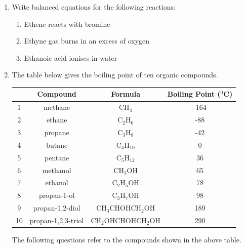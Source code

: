 \begin{eocexercises}{}
\begin{enumerate}
{(IEB 2003)
}

\item{
Write balanced equations for the following reactions:
	\begin{enumerate}
	\item{Ethene reacts with bromine}
	\item{Ethyne gas burns in an excess of oxygen}
	\item{Ethanoic acid ionises in water}
	\end{enumerate}
}

\item{The table below gives the boiling point of ten organic compounds.}

\begin{center}
\begin{tabular}{|c|c|c|c|}\hline
 & \textbf{Compound} & \textbf{Formula} & \textbf{Boiling Point ($^{0}$C)} \\\hline
1 & methane & CH$_{4}$ & -164\\\hline
2 & ethane & C$_{2}$H$_{6}$ & -88 \\\hline
3 & propane & C$_{3}$H$_{8}$ & -42 \\\hline
4 & butane & C$_{4}$H$_{10}$ & 0 \\\hline
5 & pentane & C$_{5}$H$_{12}$ & 36 \\\hline
6 & methanol & CH$_{3}$OH & 65 \\\hline
7 & ethanol & C$_{2}$H$_{5}$OH & 78 \\\hline
8 & propan-1-ol & C$_{3}$H$_{7}$OH & 98 \\\hline
9 & propan-1,2-diol & CH$_{3}$CHOHCH$_{2}$OH & 189 \\\hline
10 & propan-1,2,3-triol & CH$_{2}$OHCHOHCH$_{2}$OH & 290 \\\hline 
\end{tabular}
\end{center}


The following questions refer to the compounds shown in the above table.


\end{enumerate}
\end{eocexercises}

